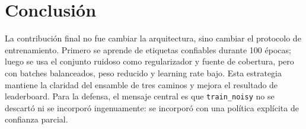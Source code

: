 \documentclass[10pt]{article}
\begin{document}
\section{Conclusión}
La contribución final no fue cambiar la arquitectura, sino cambiar el protocolo
de entrenamiento. Primero se aprende de etiquetas confiables durante 100 épocas;
luego se usa el conjunto ruidoso como regularizador y fuente de cobertura, pero
con batches balanceados, peso reducido y learning rate bajo. Esta estrategia
mantiene la claridad del ensamble de tres caminos y mejora el resultado de
leaderboard. Para la defensa, el mensaje central es que \texttt{train\_noisy}
no se descartó ni se incorporó ingenuamente: se incorporó con una política
explícita de confianza parcial.
\end{document}
